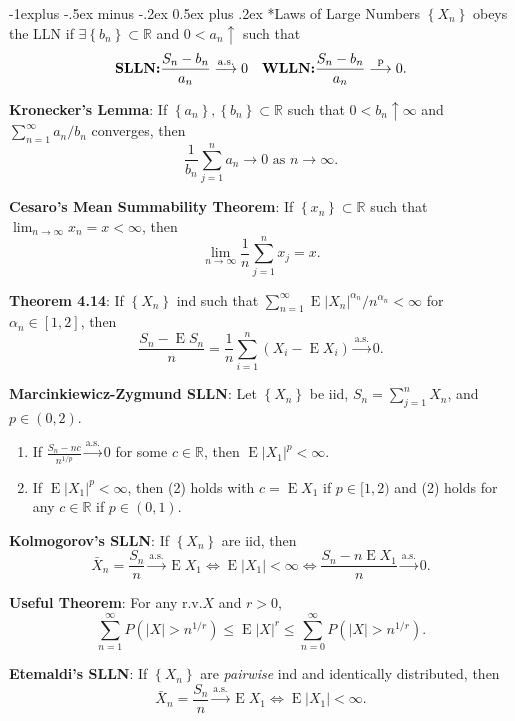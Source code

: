 \documentclass[paper=letter,fontsize=3mm]{scrartcl}
\makeatletter
\DeclareMathOperator{\E}{E}
\newcommand{\convprob}{\stackrel{\text{p}}{\longrightarrow}}
\newcommand{\convas}{\stackrel{\text{a.s.}}{\longrightarrow}}
\newcommand{\R}{\mathbb{R}}
\newcommand\abs[1]{\left| #1 \right|}
\newcommand\set[1]{\left\{ #1 \right\}}
\renewcommand{\subsection}{\@startsection{subsection}{2}{0mm}%
                                {-1explus -.5ex minus -.2ex}%
                                {0.5ex plus .2ex}%
                                {\normalfont\normalsize\bfseries}}
\makeatother
\begin{document}
\raggedright
\scriptsize
\begin{multicols*}{3}


\setlength{\premulticols}{.05pt}
\setlength{\postmulticols}{.05pt}
\setlength{\multicolsep}{.05pt}
\setlength{\columnsep}{.05pt}

\subsection*{Laws of Large Numbers}
$\set{X_n}$ obeys the LLN if $\exists \set{b_n} \subset \R$ and $0 < a_n \uparrow$ such that
$$\text{\bf{SLLN}:} \frac{S_n - b_n}{a_n} \convas 0 \quad \text{\bf{WLLN}:} \frac{S_n - b_n}{a_n} \convprob 0 .$$

\textbf{Kronecker's Lemma}:  If $\set{a_n}, \set{b_n} \subset \R$ such that $0<b_n \uparrow \infty$ and $\sum_{n=1}^\infty a_n/b_n$ converges, then
$$ \frac{1}{b_n} \sum_{j=1}^n a_n \to 0 \text{ as } n \to \infty.$$

\textbf{Cesaro's Mean Summability Theorem}: If $\set{x_n} \subset \R$ such that $\lim_{n\to\infty}x_n=x<\infty$, then 
$$\lim_{n\to\infty} \frac{1}{n}\sum_{j=1}^nx_j = x.$$

\textbf{Theorem 4.14}: If $\set{X_n}$ ind such that $\sum_{n=1}^\infty \E\abs{X_n}^{\alpha_n}/n^{\alpha_n} < \infty$ for $\alpha_n \in [1,2]$, then
$$\frac{S_n - \E S_n}{n} = \frac{1}{n}\sum_{i=1}^n (X_i - \E X_i) \convas 0.$$

\textbf{Marcinkiewicz-Zygmund SLLN}: Let $\set{X_n}$ be iid, $S_n = \sum_{j=1}^nX_n$, and $p \in (0,2)$.
\begin{enumerate}
\item If $\frac{S_n -nc}{n^{1/p}}\convas 0$ for some $c \in \R$, then $\E\abs{X_1}^p < \infty$.
\item If $\E\abs{X_1}^p < \infty$, then (2) holds with $c = \E X_1$ if $p \in [1,2)$ and (2) holds for any $c\in \R$ if $p \in (0,1)$.
\end{enumerate}

\textbf{Kolmogorov's SLLN}: If $\set{X_n}$ are iid, then 
$$\bar{X}_n = \frac{S_n}{n} \convas \E X_1 \iff \E\abs{X_1} < \infty \iff \frac{S_n - n\E X_1}{n} \convas 0.$$

\textbf{Useful Theorem}: For any r.v.\@  $X$ and $r > 0$,
$$\sum_{n=1}^\infty P(\abs{X} > n^{1/r}) \le \E\abs{X}^r \le \sum_{n=0}^\infty P(\abs{X} > n^{1/r}).$$

\textbf{Etemaldi's SLLN}: If $\set{X_n}$ are \emph{pairwise} ind and identically distributed, then 
$$\bar{X}_n = \frac{S_n}{n} \convas \E X_1 \iff \E\abs{X_1} < \infty.$$


\end{multicols*}
\end{document}
